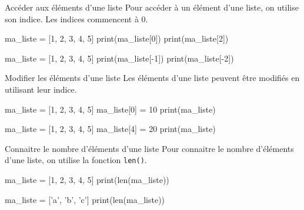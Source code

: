 \begin{easybox}{Accéder aux éléments d'une liste}{}
	Pour accéder à un élément d'une liste, on utilise son indice. Les indices commencent à 0.

	\smallskip

	\begin{minipage}{0.48\linewidth}
		\begin{ConsolePythontex}[Label=false]{}
ma_liste = [1, 2, 3, 4, 5]
print(ma_liste[0]) 
print(ma_liste[2]) 
		\end{ConsolePythontex}
	\end{minipage}\hfill
	\begin{minipage}{0.48\linewidth}
		\begin{ConsolePythontex}[Label=false]{}
ma_liste = [1, 2, 3, 4, 5]
print(ma_liste[-1]) 
print(ma_liste[-2])
		\end{ConsolePythontex}
	\end{minipage}
	\end{easybox}

	\begin{easybox}{Modifier les éléments d'une liste}{}
		Les éléments d'une liste peuvent être modifiés en utilisant leur indice.

	\begin{minipage}{0.48\linewidth}
		\begin{ConsolePythontex}[Label=false]{}
ma_liste = [1, 2, 3, 4, 5]
ma_liste[0] = 10
print(ma_liste)
		\end{ConsolePythontex}
	\end{minipage}\hfill
	\begin{minipage}{0.48\linewidth}
		\begin{ConsolePythontex}[Label=false]{}
ma_liste = [1, 2, 3, 4, 5]
ma_liste[4] = 20
print(ma_liste)
		\end{ConsolePythontex}
	\end{minipage}
\end{easybox}

\begin{easybox}{Connaitre le nombre d'éléments d'une liste}{}
	Pour connaitre le nombre d'éléments d'une liste, on utilise la fonction \verb|len()|.

	\begin{minipage}{0.48\linewidth}
		\begin{ConsolePythontex}[Label=false]{}
ma_liste = [1, 2, 3, 4, 5]
print(len(ma_liste))
		\end{ConsolePythontex}
	\end{minipage}\hfill
	\begin{minipage}{0.48\linewidth}
		\begin{ConsolePythontex}[Label=false]{}
ma_liste = ['a', 'b', 'c']
print(len(ma_liste))
		\end{ConsolePythontex}
	\end{minipage}
\end{easybox}

